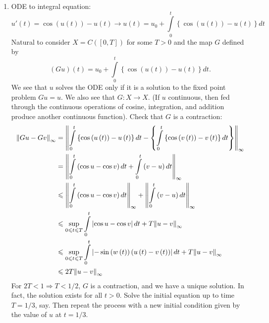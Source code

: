 \documentclass[letterpaper,twoside,11pt]{article}
\theoremstyle{mystyle}
\newcommand{\cblu}{\color{blue}}
\begin{document}
\cblu 
\begin{enumerate}
  \item ODE to integral equation: 
  \[u'\left( t \right) = \cos \left( {u\left( t \right)} \right) - u\left( t \right) \longrightarrow u\left( t \right) = {u_0} + \int\limits_0^t {\left\{ {\cos \left( {u\left( t \right)} \right) - u\left( t \right)} \right\}dt} \]
  Natural to consider $X = C([0,T])$ for some $T > 0$ and the map $G$ defined by 
  \[\left( {Gu} \right)\left( t \right) = {u_0} + \int\limits_0^t {\left\{ {\cos \left( {u\left( t \right)} \right) - u\left( t \right)} \right\}dt} .\]
  We see that $u$ solves the ODE only if it is a solution to the fixed point problem $Gu = u$. We also see that $G : X \to X$. (If $u$ continuous, then fed through the continuous operations of cosine, integration, and addition produce another continuous function). Check that $G$ is a contraction: 
  \begin{align*}
      {\left\| {Gu - Gv} \right\|_\infty } &= {\left\| {\int\limits_0^t {\left\{ {\cos \left( {u\left( t \right)} \right) - u\left( t \right)} \right\}dt}  - \left\{ {\int\limits_0^t {\left\{ {\cos \left( {v\left( t \right)} \right) - v\left( t \right)} \right\}dt} } \right\}} \right\|_\infty } \hfill \\
       &= {\left\| {\int\limits_0^t {\left( {\cos u - \cos v} \right)dt}  + \int\limits_0^t {\left( {v - u} \right)dt} } \right\|_\infty } \hfill \\
       &\leqslant {\left\| {\int\limits_0^t {\left( {\cos u - \cos v} \right)dt} } \right\|_\infty } + {\left\| {\int\limits_0^t {\left( {v - u} \right)dt} } \right\|_\infty } \hfill \\
       &\leqslant \mathop {\sup }\limits_{0 \leqslant t \leqslant T} \int\limits_0^t {\left| {\cos u - \cos v} \right|dt}  + T{\left\| {u - v} \right\|_\infty } \hfill \\
       &\leqslant \mathop {\sup }\limits_{0 \leqslant t \leqslant T} \int\limits_0^t {\left| { - \sin \left( {w\left( t \right)} \right)\left( {u\left( t \right) - v\left( t \right)} \right)} \right|dt}  + T{\left\| {u - v} \right\|_\infty } \hfill \\
       &\leqslant 2T{\left\| {u - v} \right\|_\infty }
  \end{align*}
  For $2T<1 \Rightarrow T < 1/2$, $G$ is a contraction, and we have a unique solution. In fact, the solution exists for all $t>0$. Solve the initial equation up to time $T = 1/3$, say. Then repeat the process with a new initial condition given by the value of $u$ at $t = 1/3$. 

\end{enumerate}
\end{document}
